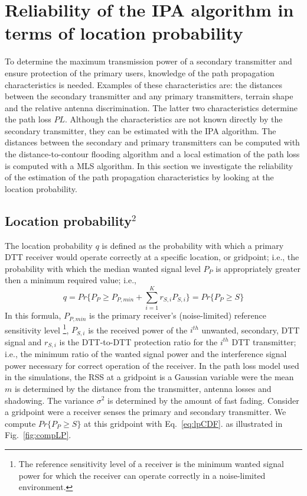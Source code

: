
\section{Reliability of the IPA algorithm in terms of location probability}\label{sec:contri1}

To determine the maximum transmission power of a secondary transmitter and ensure protection of the primary users, knowledge of the path propagation characteristics is needed. Examples of these characteristics are: the distances between the secondary transmitter and any primary transmitters, terrain shape and the relative antenna discrimination. The latter two characteristics determine the path loss $PL$. Although the characteristics are not known directly by the secondary transmitter, they can be estimated with the IPA algorithm. The distances between the secondary and primary transmitters can be computed with the distance-to-contour flooding algorithm and a local estimation of the path loss is computed with a MLS algorithm. In this section we investigate the reliability of the estimation of the path propagation characteristics by looking at the location probability.

\subsection[title]{Location probability$^2$}

\setcounter{footnote}{2}

The location probability $q$ is defined as the probability with which a primary DTT receiver would operate correctly at a specific location, or gridpoint; i.e., the probability with which the median wanted signal level $P_P$ is appropriately greater then a minimum required value; i.e.,
\begin{equation} \label{eq:lp}
q=Pr\{P_P\geq P_{P,min}+\sum_{i=1}^K r_{S,i}P_{S,i}\}=Pr\{P_P\geq S\} \nonumber
\end{equation}
In this formula, $P_{P,min}$ is the primary receiver's (noise-limited) reference sensitivity level \footnote{The reference sensitivity level of a receiver is the minimum wanted signal power for which the receiver can operate correctly in a noise-limited environment.}, $P_{S,i}$ is the received power of the $i^{th}$ unwanted, secondary, DTT signal and $r_{S,i}$ is the DTT-to-DTT protection ratio for the $i^{th}$ DTT transmitter; i.e., the minimum ratio of the wanted signal power and the interference signal power necessary for correct operation of the receiver. In the path loss model used in the simulations, the RSS at a gridpoint is a Gaussian variable were the mean $m$ is determined by the distance from the transmitter, antenna losses and shadowing. The variance $\sigma^2$ is determined by the amount of fast fading. Consider a gridpoint were a receiver senses the primary and secondary transmitter. We compute $Pr\{P_P\geq S\}$ at this gridpoint with Eq.~\ref{eq:lpCDF}.  as illustrated in Fig.~\ref{fig:compLP}. 


